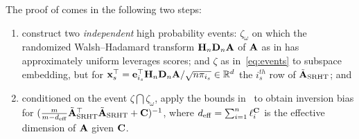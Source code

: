 \documentclass[11pt,a4paper]{article}
\begin{document}
The proof of  comes in the following two steps:
\begin{enumerate}
\item construct two \emph{independent} high probability events: $\zeta_{\omega}$ on which the randomized Walsh--Hadamard transform $\mathbf{H}_n \mathbf{D}_n \mathbf{A}$ of $\mathbf{A}$ as in  has approximately uniform leverages scores; and $\zeta$ as in~\eqref{eq:events} to subspace embedding, but for $\mathbf{x}^\top_s=\mathbf{e}^\top_{i_s}\mathbf{H}_n \mathbf{D}_n\mathbf{A}/\sqrt{n\pi_{i_s}} \in {\mathbb{R}}^d $ the $i_s^{th}$ row of $\tilde{\mathbf{A}}_{\rm SRHT}$; and 
\item conditioned on the event $\zeta\bigcap\zeta_{\omega}$, apply the bounds in~ to obtain inversion bias for $(\frac{m}{m-d_{\mathrm{eff}}}\tilde{\mathbf{A}}_{\rm SRHT}^\top \tilde{\mathbf{A}}_{\rm SRHT} + \mathbf{C} )^{-1}$, where $d_{\mathrm{eff}}=\sum_{i=1}^n \ell^{\mathbf{C}}_i $ is the effective dimension of $\mathbf{A}$ given $\mathbf{C}$.
\end{enumerate}
\end{document}
